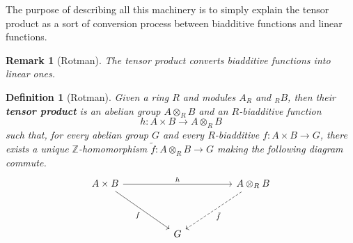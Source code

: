 \documentclass[12pt,reqno]{amsart}
\theoremstyle{plain}
\newtheorem{defi}{Definition}
\newtheorem{rem}{Remark}
\newcommand{\zz}{\mathbb Z}
\begin{document}
The purpose of describing all this machinery is to simply explain the tensor product as a sort of conversion process between biadditive functions and linear functions.
\begin{rem}[Rotman]The tensor product converts biadditive functions into linear ones. 
\end{rem} 
\begin{defi}[Rotman] Given a ring $R$ and modules $A_R$ and $_R B$, then their \textbf{tensor product}  is an abelian group $A \otimes_R B$ and an $R$-biadditive function
$$ h \colon A \times B \to A \otimes_R B$$ such that, for every abelian group $G$ and every $R$-biadditive $f \colon A \times B \to G$, there exists a unique $\zz$-homomorphism $\tilde{f} \colon A \otimes_R B \to G$ making the following diagram commute. 
$$\begin{tikzcd}
A \times B \arrow[rrrr, "h"] \arrow[rrdd, "f"'] &  &   &  & A \otimes_R B \arrow[lldd, "\tilde{f}", dashed] \\
                                       &  &   &  &                             \\
                                       &  & G &  &                            
\end{tikzcd}$$
\end{defi} 
\end{document}
